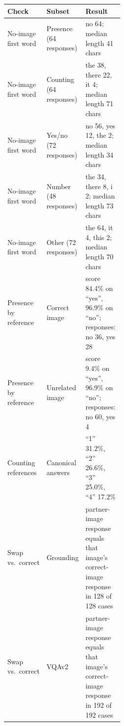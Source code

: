 \begin{tabular}{ll>{\raggedright\arraybackslash}p{0.47\linewidth}}
\toprule
Check & Subset & Result \\
\midrule
No-image first word & Presence (64 responses) & no 64; median length 41 chars \\
No-image first word & Counting (64 responses) & the 38, there 22, it 4; median length 71 chars \\
No-image first word & Yes/no (72 responses) & no 56, yes 12, the 2; median length 34 chars \\
No-image first word & Number (48 responses) & the 34, there 8, i 2; median length 73 chars \\
No-image first word & Other (72 responses) & the 64, it 4, this 2; median length 70 chars \\
Presence by reference & Correct image & score 84.4\% on ``yes'', 96.9\% on ``no''; responses: no 36, yes 28 \\
Presence by reference & Unrelated image & score 9.4\% on ``yes'', 96.9\% on ``no''; responses: no 60, yes 4 \\
Counting references & Canonical answers & ``1'' 31.2\%, ``2'' 26.6\%, ``3'' 25.0\%, ``4'' 17.2\% \\
Swap vs.\ correct & Grounding & partner-image response equals that image's correct-image response in 128 of 128 cases \\
Swap vs.\ correct & VQAv2 & partner-image response equals that image's correct-image response in 192 of 192 cases \\
\bottomrule
\end{tabular}